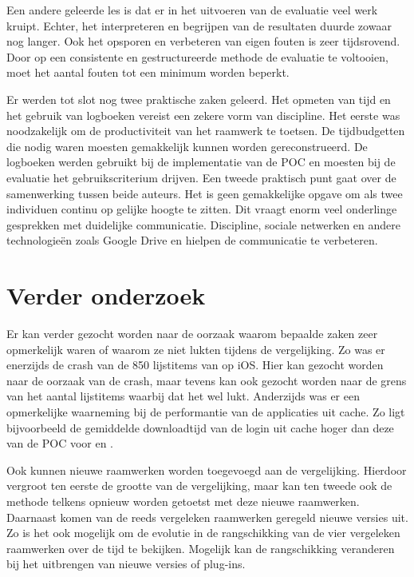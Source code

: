Een andere geleerde les is dat er in het uitvoeren van de evaluatie veel werk kruipt.
Echter, het interpreteren en begrijpen van de resultaten duurde zowaar nog langer.
Ook het opsporen en verbeteren van eigen fouten is zeer tijdsrovend.
Door op een consistente en gestructureerde methode de evaluatie te voltooien, moet het aantal fouten tot een minimum worden beperkt.

Er werden tot slot nog twee praktische zaken geleerd.
Het opmeten van tijd en het gebruik van logboeken vereist een zekere vorm van discipline.
Het eerste was noodzakelijk om de productiviteit van het raamwerk te toetsen.
De tijdbudgetten die nodig waren moesten gemakkelijk kunnen worden gereconstrueerd.
De logboeken werden gebruikt bij de implementatie van de POC en moesten bij de evaluatie het gebruikscriterium drijven.
Een tweede praktisch punt gaat over de samenwerking tussen beide auteurs.
Het is geen gemakkelijke opgave om als twee individuen continu op gelijke hoogte te zitten.
Dit vraagt enorm veel onderlinge gesprekken met duidelijke communicatie.
Discipline, sociale netwerken en andere technologieën zoals Google Drive en \gh{} hielpen de communicatie te verbeteren.

\section{Verder onderzoek} %
Er kan verder gezocht worden naar de oorzaak waarom bepaalde zaken zeer opmerkelijk waren of waarom ze niet lukten tijdens de vergelijking.
Zo was er enerzijds de crash van de 850 lijstitems van \kendo{} op iOS.
Hier kan gezocht worden naar de oorzaak van de crash, maar tevens kan ook gezocht worden naar de grens van het aantal lijstitems waarbij dat het wel lukt.
Anderzijds was er een opmerkelijke waarneming bij de performantie van de applicaties uit cache. 
Zo ligt bijvoorbeeld de gemiddelde downloadtijd van de login uit cache hoger dan deze van de POC voor \jqm{} en \lungo{}. 

Ook kunnen nieuwe raamwerken worden toegevoegd aan de vergelijking.
Hierdoor vergroot ten eerste de grootte van de vergelijking, maar kan ten tweede ook de methode telkens opnieuw worden getoetst met deze nieuwe raamwerken.
Daarnaast komen van de reeds vergeleken raamwerken geregeld nieuwe versies uit.
Zo is het ook mogelijk om de evolutie in de rangschikking van de vier vergeleken raamwerken over de tijd te bekijken.
Mogelijk kan de rangschikking veranderen bij het uitbrengen van nieuwe versies of plug-ins.

